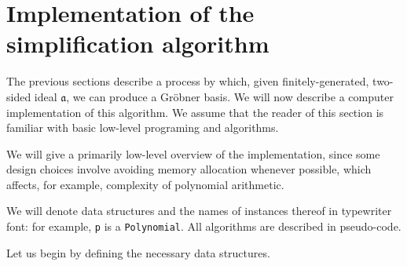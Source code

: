 \section{Implementation of the simplification algorithm}
\label{sec:implementation}

The previous sections describe a process by which, given finitely-generated,
two-sided ideal $\mathfrak{a}$, we can produce a Gr\"obner basis. We will now
describe a computer implementation of this algorithm. We assume that the
reader of this section is familiar with basic low-level programing and algorithms.

\begin{rem}
    We will give a primarily low-level overview of the implementation, since some
    design choices involve avoiding memory allocation whenever possible, which
    affects, for example, complexity of polynomial arithmetic. 
    
    We will denote data structures and the names of instances thereof in typewriter font:
    for example, \verb|p| is a \verb|Polynomial|. All algorithms are described in
    pseudo-code.
\end{rem}

Let us begin by defining the necessary data structures.

